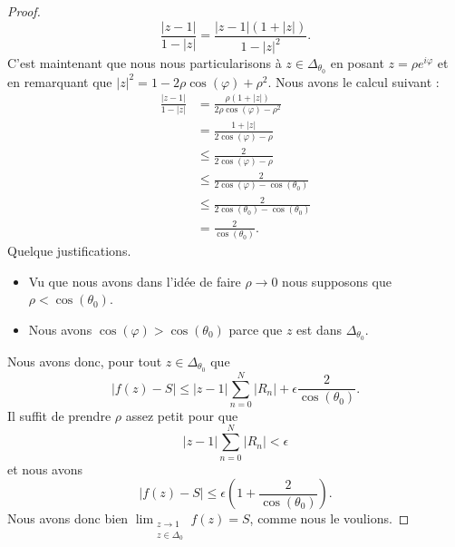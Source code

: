 \begin{proof}
    \begin{equation}
        \frac{ | z-1 | }{ 1-| z | }=\frac{ | z-1 |(1+| z |) }{ 1-| z |^2 }.
    \end{equation}
    C'est maintenant que nous nous particularisons à \( z\in\Delta_{\theta_0}\) en posant \( z=\rho e^{i\varphi}\) et en remarquant que \( | z |^2=1-2\rho\cos(\varphi)+\rho^2\). Nous avons le calcul suivant :
    \begin{subequations}
        \begin{align}
            \frac{ | z-1 | }{ 1-| z | }&=\frac{ \rho(1+| z |) }{ 2\rho\cos(\varphi)-\rho^2 }\\
            &=\frac{ 1+| z | }{ 2\cos(\varphi)-\rho}\\
            &\leq\frac{ 2 }{ 2\cos(\varphi)-\rho }\\
            &\leq\frac{ 2 }{ 2\cos(\varphi)-\cos(\theta_0) }\\
            &\leq\frac{ 2 }{ 2\cos(\theta_0)-\cos(\theta_0) }\\
            &=\frac{ 2 }{ \cos(\theta_0) }.
        \end{align}
    \end{subequations}
    Quelque justifications.
    \begin{itemize}
        \item Vu que nous avons dans l'idée de faire \( \rho\to 0\) nous supposons que \( \rho<\cos(\theta_0)\).
        \item Nous avons \( \cos(\varphi)>\cos(\theta_0)\) parce que \( z\) est dans \( \Delta_{\theta_0}\).
    \end{itemize}
    Nous avons donc, pour tout \( z\in\Delta_{\theta_0}\) que
    \begin{equation}
        | f(z)-S |\leq | z-1 |\sum_{n=0}^N| R_n |+\epsilon\frac{ 2 }{ \cos(\theta_0) }.
    \end{equation}
    Il suffit de prendre \( \rho\) assez petit pour que 
    \begin{equation}
        | z-1 |\sum_{n=0}^N| R_n |<\epsilon
    \end{equation}
    et nous avons
    \begin{equation}
        | f(z)-S |\leq \epsilon\left( 1+\frac{ 2 }{ \cos(\theta_0) } \right).
    \end{equation}
    Nous avons donc bien \( \lim_{\substack{z\to 1\\z\in\Delta_0}}f(z)=S\), comme nous le voulions.
\end{proof}

